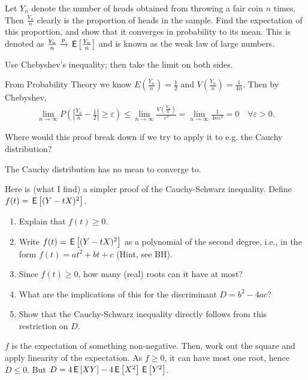 \documentclass[assignments]{subfiles}
\begin{document}
\begin{exercise}
Let $Y_n$ denote the number of heads obtained from throwing a fair coin $n$ times. Then $\frac{Y_n}{n}$ clearly is the proportion of heads in the sample. Find the expectation of this proportion, and show that it converges in probability to its mean. This is denoted as $\frac{Y_n}{n}\xrightarrow{p}\,\mathsf{E}\left[\frac{Y_n}{n}\right]$ and is known as the weak law of large numbers.\\
\begin{hint}
Use Chebyshev's inequality;  then take the limit on both sides.
\end{hint}
\begin{solution}
From Probability Theory we know $E\left(\frac{Y_n}{n}\right)=\frac12$ and $V\left(\frac{Y_n}{n}\right) = \frac{1}{4 n}$. Then by Chebyshev,
\begin{align*}
    \lim_{n\rightarrow\infty}P\left(\left|\frac{Y_n}{n}-\frac12\right| \geq \varepsilon\right) \leq  \lim_{n\rightarrow\infty}\frac{V\left(\frac{Y_n}{n}\right)}{\varepsilon^2} =  \lim_{n\rightarrow\infty}\frac{1}{4n\varepsilon^2} = 0\quad\forall\varepsilon>0.
\end{align*}
\end{solution}
\end{exercise}

\begin{exercise}
Where would this proof break down if we try to apply it to e.g. the Cauchy distribution?
\begin{solution}
The Cauchy distribution has no mean to converge to.
\end{solution}
\end{exercise}


\begin{exercise}
Here is (what I find) a simpler proof of the Cauchy-Schwarz inequality.  Define  $f(t) = \,\mathsf{E}\left[(Y-tX)^2\right]$.
\begin{enumerate}
\item Explain that $f(t)\geq 0$.
\item Write $f(t) = \,\mathsf{E}\left[(Y-tX)^2\right]$ as a polynomial of the second degree, i.e., in the form $f(t) = a t^2 + b t + c$ (Hint, see BH).
\item Since $f(t) \geq 0$, how many (real) roots can it have at most?
\item What are the implications of this for the discriminant $D=b^2-4ac$?
\item Show that the Cauchy-Schwarz inequality directly follows from this restriction on $D$.
\end{enumerate}
\begin{solution}
$f$ is the expectation of something non-negative. Then, work out the square and apply linearity of the expectation. As $f\geq 0$, it can have most one root, hence $D\leq 0$. But $D=4\,\mathsf{E}\left[XY\right] - 4\,\mathsf{E}\left[X^{2}\right]\,\mathsf{E}\left[Y^{2}\right]$.
\end{solution}
\end{exercise}
\end{document}
